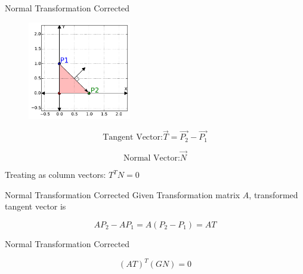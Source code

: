 \documentclass{beamer}
\begin{document}
\begin{frame}{Normal Transformation Corrected}

\begin{figure}[t]
    \centering
	\includegraphics[width=0.4\textwidth]{2DTriTangent.pdf}
\end{figure}

\[ \text{Tangent Vector:} \vec{T} = \vec{P_2} - \vec{P_1} \]

\[ \text{Normal Vector:} \vec{N} \]

Treating as column vectors: $ T^T N = 0$

\end{frame}


\begin{frame}{Normal Transformation Corrected}
Given Transformation matrix $A$, transformed tangent vector is

\[ AP_2 - AP_1 = A(P_2-P_1) = AT\]


\end{frame}


\begin{frame}{Normal Transformation Corrected}

\[ (AT)^T(GN) = 0 \]






\end{frame}
\end{document}
